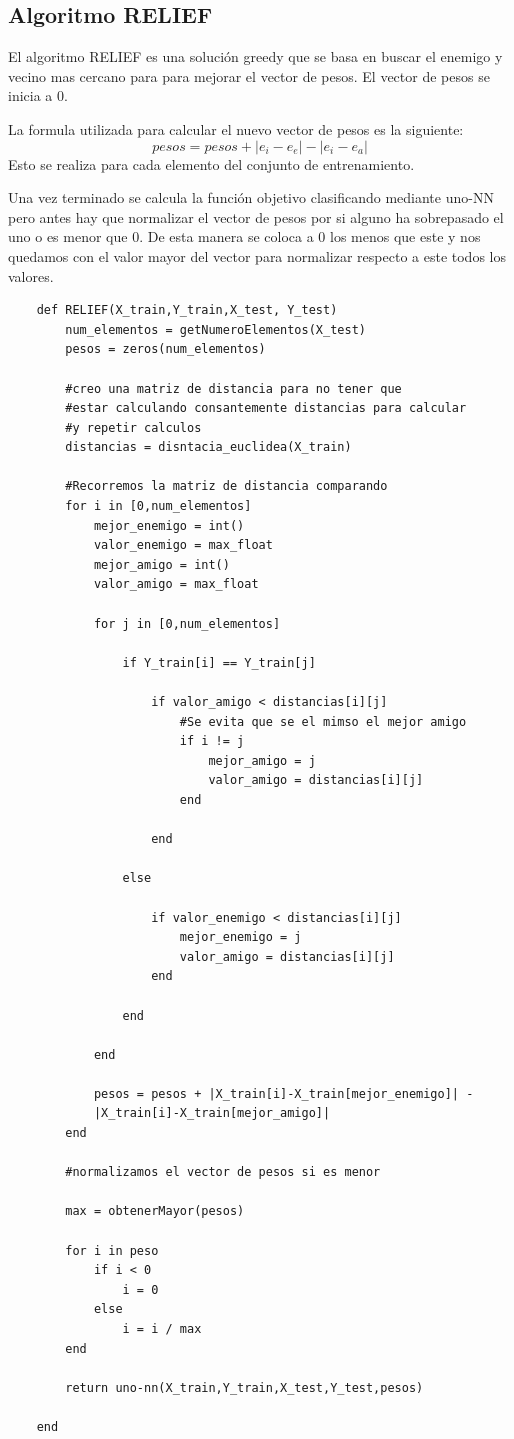 \documentclass[titlepage]{article}
\begin{document}
	\subsection{Algoritmo RELIEF}
	El algoritmo RELIEF es una solución greedy que se basa en buscar el enemigo y vecino mas cercano para para mejorar el vector de pesos. El vector de pesos se inicia a 0.
	
	La formula utilizada para calcular el nuevo vector de pesos es la siguiente:
	$$
		pesos = pesos + | e_i-e_e | - |e_i - e_a|
	$$
	Esto se realiza para cada elemento del conjunto de entrenamiento. 
	
	Una vez terminado se calcula la función objetivo clasificando mediante uno-NN pero antes hay que normalizar el vector de pesos por si alguno ha sobrepasado el uno o es menor que 0. De esta manera se coloca a 0 los menos que este y nos quedamos con el valor mayor del vector para normalizar respecto a este todos los valores. 
	\newpage
	\begin{lstlisting}
	def RELIEF(X_train,Y_train,X_test, Y_test)
		num_elementos = getNumeroElementos(X_test)
		pesos = zeros(num_elementos)
		
		#creo una matriz de distancia para no tener que 
		#estar calculando consantemente distancias para calcular 
		#y repetir calculos
		distancias = disntacia_euclidea(X_train)
		
		#Recorremos la matriz de distancia comparando
		for i in [0,num_elementos]
			mejor_enemigo = int()
			valor_enemigo = max_float
			mejor_amigo = int()
			valor_amigo = max_float
			
			for j in [0,num_elementos]
			
				if Y_train[i] == Y_train[j]
					
					if valor_amigo < distancias[i][j]
						#Se evita que se el mimso el mejor amigo
						if i != j
							mejor_amigo = j
							valor_amigo = distancias[i][j]
						end
						
					end
					
				else
				
					if valor_enemigo < distancias[i][j]
						mejor_enemigo = j
						valor_amigo = distancias[i][j]
					end
					
				end	
				
			end
			
			pesos = pesos + |X_train[i]-X_train[mejor_enemigo]| -
			|X_train[i]-X_train[mejor_amigo]|
		end
		
		#normalizamos el vector de pesos si es menor 
		
		max = obtenerMayor(pesos)
		
		for i in peso
			if i < 0
				i = 0
			else
				i = i / max
		end
		
		return uno-nn(X_train,Y_train,X_test,Y_test,pesos)
		
	end	
	\end{lstlisting}
	\newpage
\end{document}
